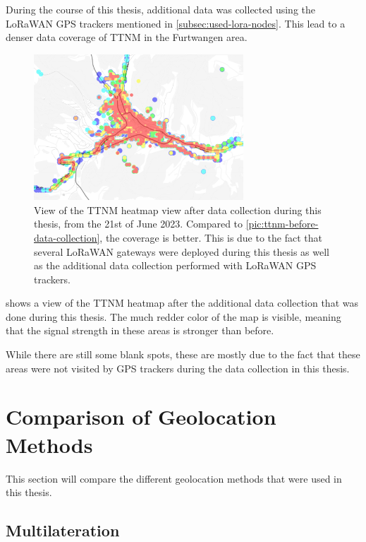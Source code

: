 During the course of this thesis, additional data was collected using the \ac{LoRaWAN} \ac{GPS} trackers mentioned in \cref{subsec:used-lora-nodes}.
This lead to a denser data coverage of \acl{TTNM} in the Furtwangen area.

\begin{figure}[htbp]
    \centering
    \includegraphics[width=0.7\textwidth]{pictures/ttn-mapper/ttnm_heatmap_after_data_collection.jpg}
    \caption{
        View of the \ac{TTNM} heatmap view after data collection during this thesis, from the 21st of June 2023.
        Compared to \cref{pic:ttnm-before-data-collection}, the coverage is better.
        This is due to the fact that several \ac{LoRaWAN} gateways were deployed during this thesis as well as the additional data collection performed with \ac{LoRaWAN} \ac{GPS} trackers.
    }\label{pic:ttnm-heatmap-after-data-collection}
\end{figure}

 shows a view of the \ac{TTNM} heatmap after the additional data collection that was done during this thesis.
The much redder color of the map is visible, meaning that the signal strength in these areas is stronger than before.

While there are still some blank spots, these are mostly due to the fact that these areas were not visited by \ac{GPS} trackers during the data collection in this thesis.

\section{Comparison of Geolocation Methods}

This section will compare the different geolocation methods that were used in this thesis.

\subsection{Multilateration}\label{subsec:conclusion-multilateration}

